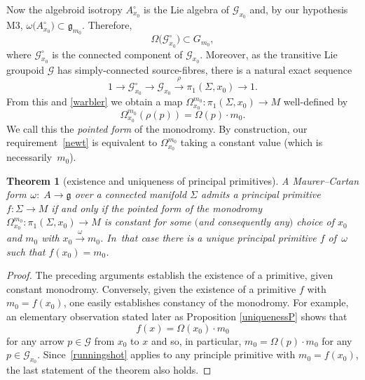 \documentclass[11pt]{article}
\numberwithin{equation}{section}
\numberwithin{equation}{section}
\newtheorem{Theorem}{Theorem}[section]
\begin{document}
Now the algebroid isotropy $A^\circ_{x_0}$ is the Lie algebra of
${\mathcal G}_{x_0} $ and, by our hypothesis M3,
$\omega\big(A^\circ_{x_0}\big) \allowbreak\subset {\mathfrak g}_{m_0}$. Therefore,
\begin{equation} \Omega\big({\mathcal G}_{x_0}^\circ\big) \subset G_{m_0},
\label{warbler}
\end{equation}
where ${\mathcal G}_{x_0}^\circ$ is the connected
component of ${\mathcal G}_{x_0}$. Moreover, as the transitive Lie
groupoid ${\mathcal G} $ has simply-connected source-fibres, there is
a natural exact sequence
\begin{equation*}
1 \rightarrow {\mathcal G}_{x_0}^\circ \rightarrow
{\mathcal G}_{x_0}\xrightarrow{\rho} \pi_1(\Sigma, x_0) \rightarrow 1.
\end{equation*} From this and \eqref{warbler} we obtain a map
$\Omega_{x_0}^{m_0} \colon \pi_1(\Sigma ,x_0) \rightarrow M$
well-defined by
\begin{equation*} \Omega_{x_0}^{m_0}(\rho ( p))=\Omega(p) \cdot m_0.
\end{equation*}
We call this the {\it pointed form} of the
monodromy. By construction, our requirement~\eqref{newt} is equivalent
to $\Omega_{x_0}^{m_0}$ taking a constant value (which is necessarily~$m_0$).

\begin{Theorem}[existence and uniqueness of principal primitives]\label{outlineT}
 A Maurer--Cartan form $\omega{\rm :}$ $A \rightarrow {\mathfrak g} $
 over a connected manifold $\Sigma $ admits a principal primitive
 $f \colon \Sigma \rightarrow M$ if and only if the pointed form of
 the monodromy
 $\Omega_{x_0}^{m_0} \colon \pi_1(\Sigma, x_0) \rightarrow M$ is
 constant for some $($and consequently any$)$ choice of $x_0$ and $m_0$
 with $x_0\xrightarrow{\omega}m_0$. In~that case there is a unique
 principal primitive $f$ of~$\omega $ such that $f(x_0)=m_0$.
\end{Theorem}

\begin{proof}The preceding arguments establish the existence of a
primitive, given constant monodromy. Conversely, given the existence
of a primitive $f$ with $m_0=f(x_0)$, one easily establishes constancy
of the monodromy. For example, an elementary observation stated later
as Proposition \ref{uniquenessP} shows that
 \begin{equation}
 f(x) = \Omega (x_0)\cdot m_0\label{runningshot}
 \end{equation}
 for any arrow $p \in {\mathcal G} $ from $x_0$ to $x$ and so, in particular, $m_0=\Omega (p)\cdot m_0$ for any $p \in
{\mathcal G}_{x_0}$. Since~\eqref{runningshot} applies to any
principle primitive with $m_0=f(x_0)$, the last statement of the
theorem also holds.
\end{proof}
\end{document}
